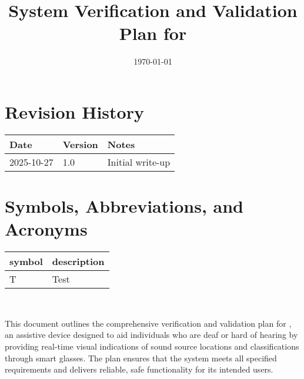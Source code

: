 \documentclass[12pt, titlepage]{article}
\begin{document}
\title{System Verification and Validation Plan for \progname{}} 
\author{\authname}
\date{\today}
	
\maketitle




\section*{Revision History}

\begin{tabularx}{\textwidth}{p{3cm}p{2cm}X}
\toprule {\bf Date} & {\bf Version} & {\bf Notes}\\
\midrule
2025-10-27 & 1.0 & Initial write-up\\
\bottomrule
\end{tabularx}

\newpage

\tableofcontents

\listoftables

\listoffigures
{}

\newpage

\section{Symbols, Abbreviations, and Acronyms}

\renewcommand{\arraystretch}{1.2}
\begin{tabular}{l l} 
  \toprule		
  \textbf{symbol} & \textbf{description}\\
  \midrule 
  T & Test\\
  \bottomrule
\end{tabular}\\



\newpage


This document outlines the comprehensive verification and validation plan for \progname{}, an assistive device designed to aid individuals who are deaf or hard of hearing by providing real-time visual indications of sound source locations and classifications through smart glasses. The plan ensures that the system meets all specified requirements and delivers reliable, safe functionality for its intended users.
\end{document}

